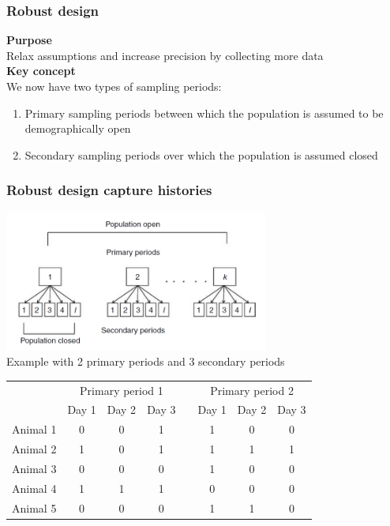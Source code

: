 \documentclass[color=usenames,dvipsnames]{beamer}\usepackage[]{graphicx}\usepackage[]{xcolor}
\begin{document}
\begin{frame}
  \frametitle{Robust design}
  {\bf Purpose} \\
  Relax assumptions and increase precision by collecting more data \\
  \pause
  \vspace{0.5cm}
  {\bf Key concept} \\
  We now have two types of sampling periods:
  \begin{enumerate}[<+- | visible@+->][\bf \color{PineGreen} (1)]
    \item \alert{Primary sampling periods} between which the population
      is assumed to be demographically open
    \item \alert{Secondary sampling periods} over which the population
      is assumed closed
  \end{enumerate}
\end{frame}


\begin{frame}
  \frametitle{Robust design capture histories}
  \centering %
    \includegraphics[width=0.65\textwidth]{figs/robustDesign} \\
  \vfill
  \pause
  Example with 2 primary periods and 3 secondary periods \\
  \small
    \begin{tabular}{lccccccc}
      \hline
      & \multicolumn{3}{c}{Primary period 1} & &
        \multicolumn{3}{c}{Primary period 2} \\
      \cline{2-4} \cline{6-8}
      & Day 1 & Day 2 & Day 3 & & Day 1 & Day 2 & Day 3 \\
      \hline
      Animal 1 & 0 & 0 & 1 & & 1 & 0 & 0 \\
      Animal 2 & 1 & 0 & 1 & & 1 & 1 & 1 \\
      Animal 3 & 0 & 0 & 0 & & 1 & 0 & 0 \\
      Animal 4 & 1 & 1 & 1 & & 0 & 0 & 0 \\
      Animal 5 & 0 & 0 & 0 & & 1 & 1 & 0 \\
      \hline
    \end{tabular}
\end{frame}
\end{document}
